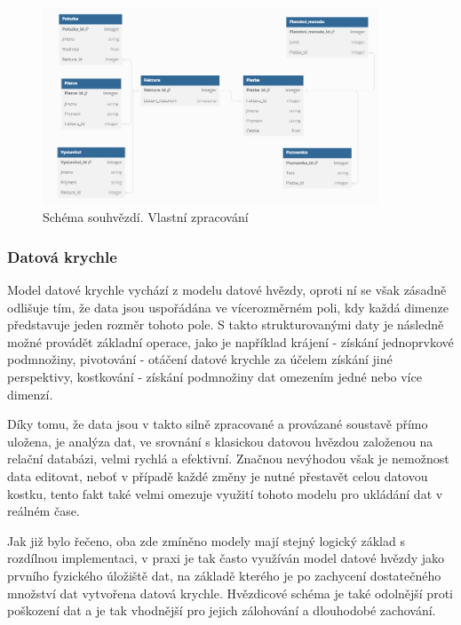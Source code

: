 \documentclass[
  digital,     %
  twoside,     %
  lof,         %
  lot,         %
]{fithesis4}
\begin{document}
\begin{figure}[h]
  \begin{center}
          \includegraphics[width=10cm]{img/Constellations.png}
  \end{center}
  \caption{Schéma souhvězdí.  Vlastní zpracování}
  \label{fig:constellation}
\end{figure}  

\subsubsection{Datová krychle}
Model datové krychle vychází z modelu datové hvězdy, oproti ní se však zásadně odlišuje tím, že data jsou uspořádána ve vícerozměrném poli, kdy každá dimenze představuje jeden rozměr tohoto pole. S takto strukturovanými daty je následně možné provádět základní operace, jako je například krájení - získání jednoprvkové podmnožiny, pivotování - otáčení datové krychle za účelem získání jiné perspektivy, kostkování - získání podmnožiny dat omezením jedné nebo více dimenzí. 

Díky tomu, že data jsou v takto silně zpracované a provázané soustavě přímo uložena, je analýza dat, ve srovnání s klasickou datovou hvězdou založenou na relační databázi, velmi rychlá a efektivní.  Značnou nevýhodou však je nemožnost data editovat, neboť v případě každé změny je nutné přestavět celou datovou kostku, tento fakt také velmi omezuje využití tohoto modelu pro ukládání dat v reálném čase.

Jak již bylo řečeno, oba zde zmíněno modely mají stejný logický základ s rozdílnou implementaci, v praxi je tak často využíván model datové hvězdy jako prvního fyzického úložiště dat, na základě kterého je po zachycení dostatečného množství dat vytvořena datová krychle. Hvězdicové schéma je také odolnější proti poškození dat a je tak vhodnější pro jejich zálohování a dlouhodobé zachování.\parencite[s.9]{Kimball2013}
\end{document}
